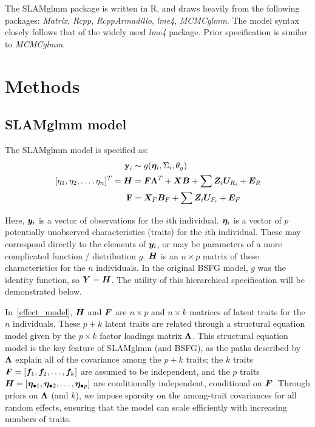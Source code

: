 \documentclass[11pt]{amsart}
\newcommand*{\B}[1]{\ifmmode\bm{#1}\else\textbf{#1}\fi}
\begin{document}
The SLAMglmm package is written in R, and draws heavily from the following packages: \emph{Matrix}, \emph{Rcpp}, \emph{RcppArmadillo}, \emph{lme4}, \emph{MCMCglmm}. The model syntax closely follows that of the widely used \emph{lme4} package. Prior specification is similar to \emph{MCMCglmm}.


\section{Methods}
\subsection{SLAMglmm model}
The SLAMglmm model is specified as:
\begin{align}
\label{effect_model}
\begin{split}
\B{y}_i &\sim g(\B{\eta}_i,\Sigma_{i},\theta_y) \\
[\eta_1, \eta_2, \dots, \eta_n]^T = \B{H} &=  \B{F}\B{\Lambda}^T + \B{X}\B{B} + \sum \B{Z}_i \B{U}_{R_i} + \B{E}_R \\
\B{F} &= \B{X}_F\B{B}_F + \sum \B{Z}_i \B{U}_{F_i} + \B{E}_F 
\end{split}
\end{align}

Here, $\B{y}_i$ is a vector of observations for the $i$th individual. 
$\B{\eta}_i$ is a vector of $p$ potentially unobserved characteristics (traits) for the $i$th individual. These may correspond directly to the elements of $\B{y}_i$, or may be parameters of a more complicated function / distribution $g$. $\B{H}$ is an $n \times p$ matrix of these characteristics for the $n$ individuals. In the original BSFG model, $g$ was the identity function, so $\B{Y} = \B{H}$. The utility of this hierarchical specification will be demonstrated below.

In~\ref{effect_model}, $\B{H}$ and $\B{F}$ are $n \times p$ and $n \times k$ matrices of latent traits for the $n$ individuals. These $p+k$ latent traits are related through a structural equation model given by the $p \times k$ factor loadings matrix $\B{\Lambda}$.  This structural equation model is the key feature of SLAMglmm (and BSFG), as the paths described by $\B{\Lambda}$ explain all of the covariance among the $p + k$ traits; the $k$ traits $\B{F} = [\B{f}_1, \B{f}_2,\dots, \B{f}_k]$ are assumed to be independent, and the $p$ traits $\B{H} = [\B{\eta}_{\bullet 1}, \B{\eta}_{\bullet 2},\dots,\B{\eta}_{\bullet p}]$ are conditionally independent, conditional on $\B{F}$. Through priors on $\B{\Lambda}$ (and $k$), we impose sparsity on the among-trait covariances for all random effects, ensuring that the model can scale efficiently with increasing numbers of traits.
\end{document}
